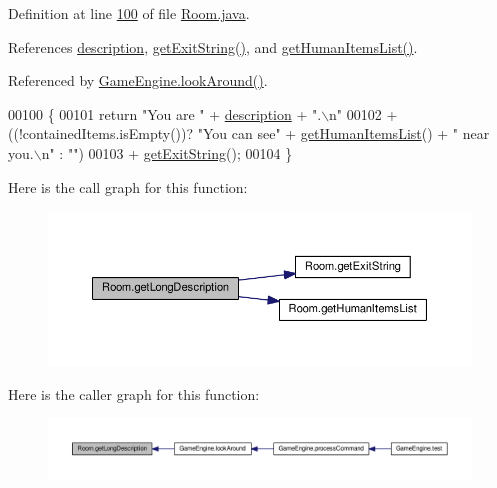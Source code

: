 Definition at line \hyperlink{Room_8java_source_l00100}{100} of file \hyperlink{Room_8java_source}{Room.\-java}.



References \hyperlink{Room_8java_source_l00016}{description}, \hyperlink{Room_8java_source_l00137}{get\-Exit\-String()}, and \hyperlink{Room_8java_source_l00110}{get\-Human\-Items\-List()}.



Referenced by \hyperlink{GameEngine_8java_source_l00264}{Game\-Engine.\-look\-Around()}.


\begin{DoxyCode}
00100                                        \{
00101         \textcolor{keywordflow}{return} \textcolor{stringliteral}{"You are "} + \hyperlink{classRoom_a2d7ecf802690a6b13750ca6fa6882d77}{description} + \textcolor{stringliteral}{".\(\backslash\)n"}
00102                 + ((!containedItems.isEmpty())? \textcolor{stringliteral}{"You can see"} + 
      \hyperlink{classRoom_ab8a87ad306f77a936873094b479bcde8}{getHumanItemsList}() + \textcolor{stringliteral}{" near you.\(\backslash\)n"} : \textcolor{stringliteral}{""})
00103                 + \hyperlink{classRoom_a2ccc382c07890a9827be232767eb98a0}{getExitString}();
00104     \}
\end{DoxyCode}


Here is the call graph for this function\-:
\nopagebreak
\begin{figure}[H]
\begin{center}
\leavevmode
\includegraphics[width=350pt]{classRoom_a23a25854d7544fb0b41190a4d6bd1322_cgraph}
\end{center}
\end{figure}




Here is the caller graph for this function\-:
\nopagebreak
\begin{figure}[H]
\begin{center}
\leavevmode
\includegraphics[width=350pt]{classRoom_a23a25854d7544fb0b41190a4d6bd1322_icgraph}
\end{center}
\end{figure}


